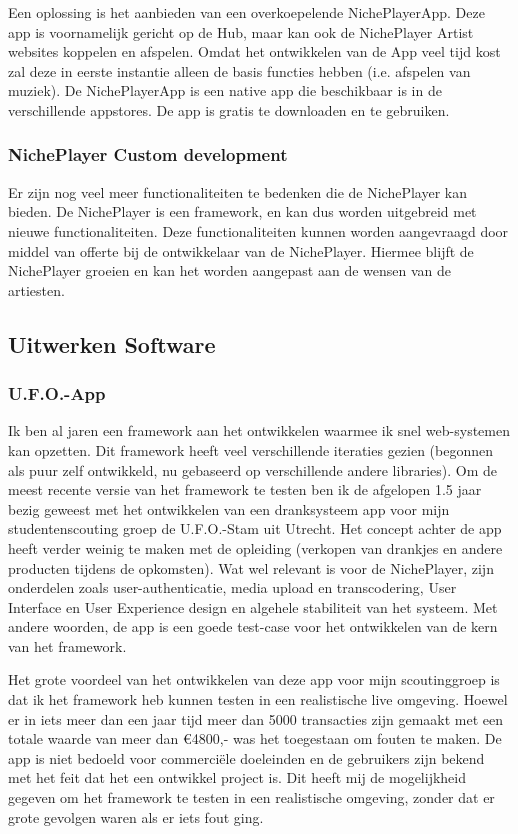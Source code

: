Een oplossing is het aanbieden van een overkoepelende NichePlayerApp. Deze app is voornamelijk gericht op de Hub, maar kan ook de NichePlayer Artist websites koppelen en afspelen. Omdat het ontwikkelen van de App veel tijd kost zal deze in eerste instantie alleen de basis functies hebben (i.e. afspelen van muziek). De NichePlayerApp is een native app die beschikbaar is in de verschillende appstores. De app is gratis te downloaden en te gebruiken.

\subsubsection*{NichePlayer Custom development}
Er zijn nog veel meer functionaliteiten te bedenken die de NichePlayer kan bieden. De NichePlayer is een framework, en kan dus worden uitgebreid met nieuwe functionaliteiten. Deze functionaliteiten kunnen worden aangevraagd door middel van offerte bij de ontwikkelaar van de NichePlayer. Hiermee blijft de NichePlayer groeien en kan het worden aangepast aan de wensen van de artiesten.

\subsection {Uitwerken Software}
\subsubsection*{U.F.O.-App}
Ik ben al jaren een framework aan het ontwikkelen waarmee ik snel web-systemen kan opzetten. Dit framework heeft veel verschillende iteraties gezien (begonnen als puur zelf ontwikkeld, nu gebaseerd op verschillende andere libraries). Om de meest recente versie van het framework te testen ben ik de afgelopen 1.5 jaar bezig geweest met het ontwikkelen van een dranksysteem app voor mijn studentenscouting groep de U.F.O.-Stam uit Utrecht. Het concept achter de app heeft verder weinig te maken met de opleiding (verkopen van drankjes en andere producten tijdens de opkomsten). Wat wel relevant is voor de NichePlayer, zijn onderdelen zoals user-authenticatie, media upload en transcodering, User Interface en User Experience design en algehele stabiliteit van het systeem. Met andere woorden, de app is een goede test-case voor het ontwikkelen van de kern van het framework.

Het grote voordeel van het ontwikkelen van deze app voor mijn scoutinggroep is dat ik het framework heb kunnen testen in een realistische live omgeving. Hoewel er in iets meer dan een jaar tijd meer dan 5000 transacties zijn gemaakt met een totale waarde van meer dan €4800,- was het toegestaan om fouten te maken. De app is niet bedoeld voor commerciële doeleinden en de gebruikers zijn bekend met het feit dat het een ontwikkel project is. Dit heeft mij de mogelijkheid gegeven om het framework te testen in een realistische omgeving, zonder dat er grote gevolgen waren als er iets fout ging.

